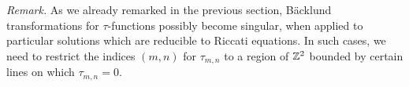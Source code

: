 \medskip\noindent
{\em Remark.}\quad
As we already remarked in the previous section, B\"acklund transformations for 
$\tau$-functions possibly become singular, when applied to particular solutions 
which are reducible to Riccati equations. 
In such cases, 
we need to restrict the indices $(m,n)$ for $\tau_{m,n}$ 
to a region of ${\Bbb Z}^2$ bounded by certain lines on which $\tau_{m,n}=0$. 
\par\medskip 

